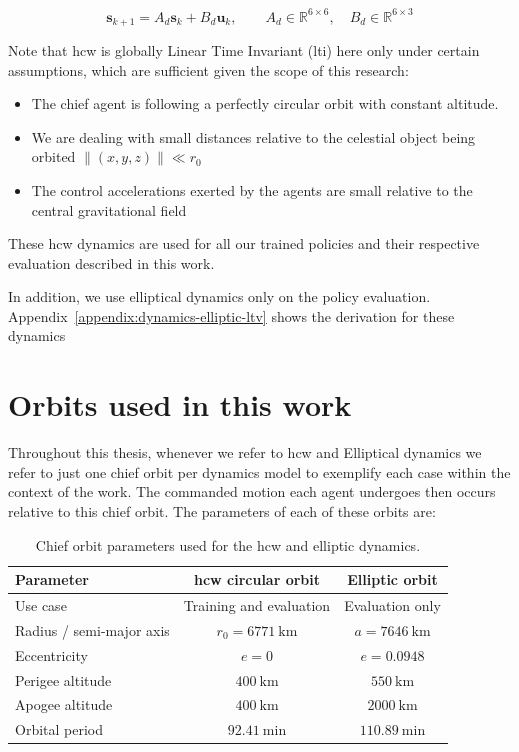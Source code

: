 \[
\mathbf{s}_{k+1} = A_d\mathbf{s}_k + B_d\mathbf{u}_k,
\qquad
A_d \in \mathbb{R}^{6\times 6},
\quad
B_d \in \mathbb{R}^{6\times 3}
\]


Note that \acs{hcw} is globally Linear Time Invariant (\acs{lti}) here only under certain assumptions, which are sufficient given the scope of this research: 

\begin{itemize}
    \item The chief agent is following a perfectly circular orbit with constant altitude. 
    \item We are dealing with small distances relative to the celestial object being orbited $\| (x,y,z)\| \ll r_0$
    \item The control accelerations exerted by the agents are small relative to the central gravitational field
\end{itemize}

These \acs{hcw} dynamics are used for all our trained policies and their respective evaluation described in this work.

In addition, we use elliptical dynamics only on the policy evaluation. Appendix~\ref{appendix:dynamics-elliptic-ltv} shows the derivation for these dynamics

\section{Orbits used in this work}
\label{subsec:dynamics-orbits-used}

Throughout this thesis, whenever we refer to \acs{hcw} and Elliptical dynamics we refer to just one chief orbit per dynamics model to exemplify each case within the context of the work. The commanded motion each agent undergoes then occurs relative to this chief orbit. The parameters of each of these orbits are:

\begin{table}[H]
\centering
\caption{Chief orbit parameters used for the \acs{hcw} and elliptic dynamics.}
\label{tab:chief-orbit-parameters}
\begin{tabular}{lcc}
\toprule
\textbf{Parameter} & \textbf{\acs{hcw} circular orbit} & \textbf{Elliptic orbit} \\
\midrule
Use case & Training and evaluation & Evaluation only \\
Radius / semi-major axis & $r_0 = 6771~\mathrm{km}$ & $a = 7646~\mathrm{km}$ \\
Eccentricity & $e = 0$ & $e = 0.0948$ \\
Perigee altitude & $400~\mathrm{km}$ & $550~\mathrm{km}$ \\
Apogee altitude & $400~\mathrm{km}$ & $2000~\mathrm{km}$ \\
Orbital period & $92.41~\mathrm{min}$ & $110.89~\mathrm{min}$ \\
\bottomrule
\end{tabular}
\end{table}

